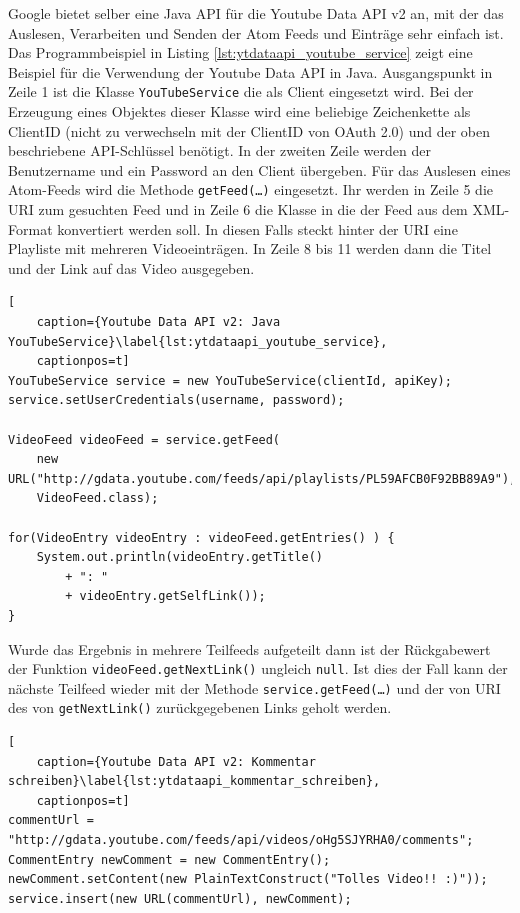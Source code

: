 Google bietet selber eine Java API für die Youtube Data API v2 an, mit der das Auslesen, Verarbeiten und Senden der Atom Feeds und Einträge sehr einfach ist. Das Programmbeispiel in Listing \ref{lst:ytdataapi_youtube_service} zeigt eine Beispiel für die Verwendung der Youtube Data API in Java. Ausgangspunkt in Zeile 1 ist die Klasse \texttt{YouTubeService} die als Client eingesetzt wird. Bei der Erzeugung eines Objektes dieser Klasse wird eine beliebige Zeichenkette als ClientID (nicht zu verwechseln mit der ClientID von OAuth 2.0) und der oben beschriebene API-Schlüssel benötigt. In der zweiten Zeile werden der Benutzername und ein Password an den Client übergeben. Für das Auslesen eines Atom-Feeds wird die Methode \texttt{getFeed(\dots)} eingesetzt. Ihr werden in Zeile 5 die URI zum gesuchten Feed und in Zeile 6 die Klasse in die der Feed aus dem XML-Format konvertiert werden soll. In diesen Falls steckt hinter der URI eine Playliste mit mehreren Videoeinträgen. In Zeile 8 bis 11 werden dann die Titel und der Link auf das Video ausgegeben.

\begin{lstlisting}[
    caption={Youtube Data API v2: Java YouTubeService}\label{lst:ytdataapi_youtube_service},
    captionpos=t]
YouTubeService service = new YouTubeService(clientId, apiKey);
service.setUserCredentials(username, password);

VideoFeed videoFeed = service.getFeed(
    new URL("http://gdata.youtube.com/feeds/api/playlists/PL59AFCB0F92BB89A9"), 
    VideoFeed.class);

for(VideoEntry videoEntry : videoFeed.getEntries() ) {
    System.out.println(videoEntry.getTitle() 
        + ": " 
        + videoEntry.getSelfLink());
}
\end{lstlisting}

Wurde das Ergebnis in mehrere Teilfeeds aufgeteilt dann ist der Rückgabewert der Funktion \texttt{videoFeed.getNextLink()} ungleich \texttt{null}. Ist dies der Fall kann der nächste Teilfeed wieder mit der Methode \texttt{service.getFeed(\dots)} und der von URI des von \texttt{getNextLink()} zurückgegebenen Links geholt werden.

\begin{lstlisting}[
    caption={Youtube Data API v2: Kommentar schreiben}\label{lst:ytdataapi_kommentar_schreiben},
    captionpos=t]
commentUrl = "http://gdata.youtube.com/feeds/api/videos/oHg5SJYRHA0/comments";
CommentEntry newComment = new CommentEntry();
newComment.setContent(new PlainTextConstruct("Tolles Video!! :)"));
service.insert(new URL(commentUrl), newComment);
\end{lstlisting}

